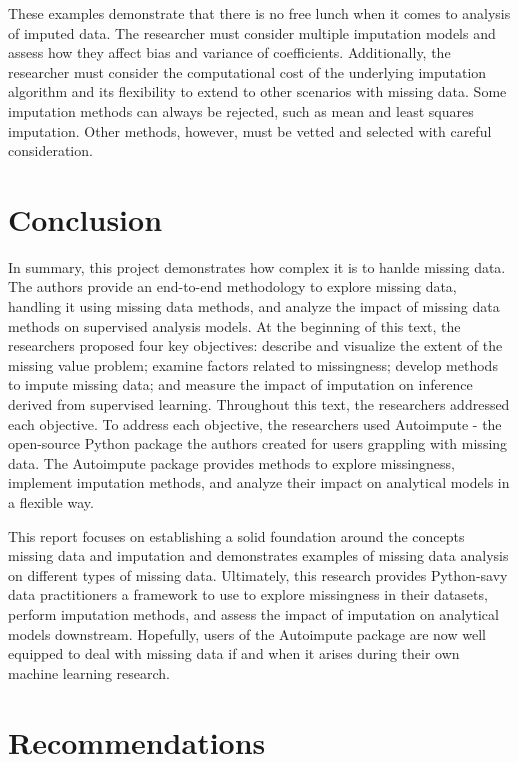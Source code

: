 \documentclass[12pt,oneside]{chicagocapstone}
\begin{document}
These examples demonstrate that there is no free lunch when it comes to
analysis of imputed data. The researcher must consider multiple
imputation models and assess how they affect bias and variance of
coefficients. Additionally, the researcher must consider the
computational cost of the underlying imputation algorithm and its
flexibility to extend to other scenarios with missing data. Some
imputation methods can always be rejected, such as mean and least
squares imputation. Other methods, however, must be vetted and selected
with careful consideration.

\chapter*{Conclusion}\label{conclusion}

In summary, this project demonstrates how complex it is to hanlde
missing data. The authors provide an end-to-end methodology to explore
missing data, handling it using missing data methods, and analyze the
impact of missing data methods on supervised analysis models. At the
beginning of this text, the researchers proposed four key objectives:
describe and visualize the extent of the missing value problem; examine
factors related to missingness; develop methods to impute missing data;
and measure the impact of imputation on inference derived from
supervised learning. Throughout this text, the researchers addressed
each objective. To address each objective, the researchers used
Autoimpute - the open-source Python package the authors created for
users grappling with missing data. The Autoimpute package provides
methods to explore missingness, implement imputation methods, and
analyze their impact on analytical models in a flexible way.

This report focuses on establishing a solid foundation around the
concepts missing data and imputation and demonstrates examples of
missing data analysis on different types of missing data. Ultimately,
this research provides Python-savy data practitioners a framework to use
to explore missingness in their datasets, perform imputation methods,
and assess the impact of imputation on analytical models downstream.
Hopefully, users of the Autoimpute package are now well equipped to deal
with missing data if and when it arises during their own machine
learning research.

\chapter*{Recommendations}\label{recommendations}
\end{document}

